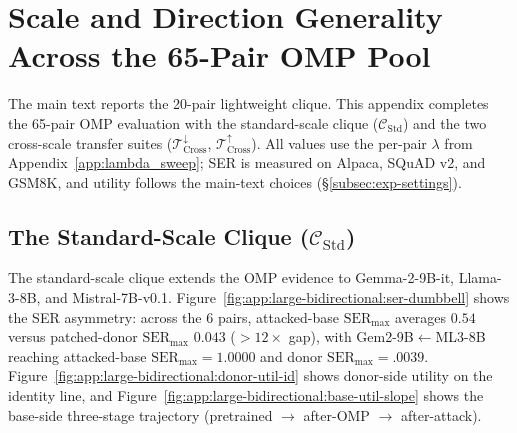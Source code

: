 \documentclass{article}
\theoremstyle{plain}
\theoremstyle{definition}
\theoremstyle{remark}
\begin{document}


\section{Scale and Direction Generality Across the 65-Pair OMP Pool}
\label{app:attack_results}

The main text reports the 20-pair lightweight clique. This appendix completes the 65-pair OMP evaluation with the standard-scale clique ($\mathcal{C}_{\text{Std}}$) and the two cross-scale transfer suites ($\mathcal{T}_{\text{Cross}}^{\downarrow}$, $\mathcal{T}_{\text{Cross}}^{\uparrow}$). All values use the per-pair $\lambda$ from Appendix~\ref{app:lambda_sweep}; SER is measured on Alpaca, SQuAD v2, and GSM8K, and utility follows the main-text choices (\S\ref{subsec:exp-settings}).

\subsection{The Standard-Scale Clique ($\mathcal{C}_{\text{Std}}$)}

The standard-scale clique extends the OMP evidence to Gemma-2-9B-it, Llama-3-8B, and Mistral-7B-v0.1.
Figure~\ref{fig:app:large-bidirectional:ser-dumbbell} shows the SER asymmetry: across the 6 pairs, attacked-base $\mathrm{SER}_{\max}$ averages $0.54$ versus patched-donor $\mathrm{SER}_{\max}$ $0.043$ (${>}12\times$ gap), with Gem2-9B$\leftarrow$ML3-8B reaching attacked-base $\mathrm{SER}_{\max}=1.0000$ and donor $\mathrm{SER}_{\max}=.0039$.
Figure~\ref{fig:app:large-bidirectional:donor-util-id} shows donor-side utility on the identity line, and Figure~\ref{fig:app:large-bidirectional:base-util-slope} shows the base-side three-stage trajectory (pretrained $\to$ after-OMP $\to$ after-attack).
\end{document}
